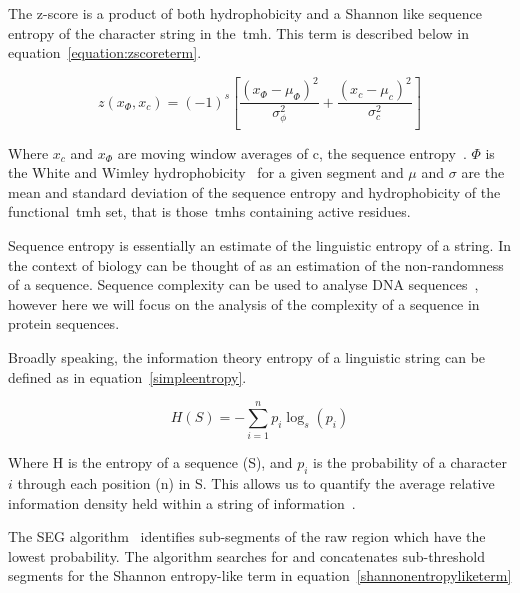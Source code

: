 The z-score is a product of both hydrophobicity and a Shannon like sequence entropy \cite{Wong2011, Wong2012} of the character string in the~\gls{tmh}. This term is described below in equation~\ref{equation:zscoreterm}.

\begin{equation} \label{equation:zscoreterm}
z({x}_{\Phi},{x}_{c})={(-1)}^{s}\left[\frac{{({x}_{\Phi}-{\mu}_{\Phi})}^{2}}{{\sigma}_{\phi}^{2}}+\frac{{({x}_{c}-{\mu}_{c})}^{2}}{{\sigma}_{c}^{2}}\right]
\end{equation}

Where $x_c$ and $x_\Phi$ are moving window averages of c, the sequence entropy~\cite{Wootton1996}. $\Phi$ is the White and Wimley hydrophobicity~\cite{White1999} for a given segment and $\mu$ and $\sigma$ are the mean and standard deviation of the sequence entropy and hydrophobicity of the functional~\gls{tmh} set, that is those~\gls{tmh}s containing active residues.

Sequence entropy is essentially an estimate of the linguistic entropy of a string.
In the context of biology can be thought of as an estimation of the non-randomness of a sequence.
Sequence complexity can be used to analyse DNA sequences~\cite{Pinho2013, Oliver1993, Troyanskaya2002}, however here we will focus on the analysis of the complexity of a sequence in protein sequences.

Broadly speaking, the information theory entropy of a linguistic string can be defined as in equation~\ref{simpleentropy}.

\begin{equation} \label{simpleentropy}
	H(S)=-{\sum_{i=1}^n {p_i\log_s(p_i)}}
\end{equation}

Where H is the entropy of a sequence (S), and $p_i$ is the probability of a character $i$ through each position (n) in S. This allows us to quantify the average relative information density held within a string of information~\cite{Shannon1948}.

The SEG algorithm~\cite{WOOTTON1994269, Wootton1996} identifies sub-segments of the raw region which have the lowest probability.
The algorithm searches for and concatenates sub-threshold segments for the Shannon entropy-like term in equation~\ref{shannonentropyliketerm}

